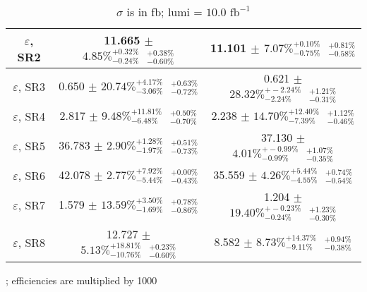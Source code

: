 \documentclass{article}
\begin{document}
\begin{table}
\begin{tabular}{|c|c|c|}
\hline
$\varepsilon$, SR2 & 11.665 $\pm$ $4.85\%^{+0.32\%}_{-0.24\%} \textrm{ }^{+0.38\%}_{-0.60\%}$ & 11.101 $\pm$ $7.07\%^{+0.10\%}_{-0.75\%} \textrm{ }^{+0.81\%}_{-0.58\%}$ \\ 
\hline
$\varepsilon$, SR3 & 0.650 $\pm$ $20.74\%^{+4.17\%}_{-3.06\%} \textrm{ }^{+0.63\%}_{-0.72\%}$ & 0.621 $\pm$ $28.32\%^{+-2.24\%}_{-2.24\%} \textrm{ }^{+1.21\%}_{-0.31\%}$ \\ 
\hline
$\varepsilon$, SR4 & 2.817 $\pm$ $9.48\%^{+11.81\%}_{-6.48\%} \textrm{ }^{+0.50\%}_{-0.70\%}$ & 2.238 $\pm$ $14.70\%^{+12.40\%}_{-7.39\%} \textrm{ }^{+1.12\%}_{-0.46\%}$ \\ 
\hline
$\varepsilon$, SR5 & 36.783 $\pm$ $2.90\%^{+1.28\%}_{-1.97\%} \textrm{ }^{+0.51\%}_{-0.73\%}$ & 37.130 $\pm$ $4.01\%^{+-0.99\%}_{-0.99\%} \textrm{ }^{+1.07\%}_{-0.35\%}$ \\ 
\hline
$\varepsilon$, SR6 & 42.078 $\pm$ $2.77\%^{+7.92\%}_{-5.44\%} \textrm{ }^{+0.00\%}_{-0.43\%}$ & 35.559 $\pm$ $4.26\%^{+5.44\%}_{-4.55\%} \textrm{ }^{+0.74\%}_{-0.54\%}$ \\ 
\hline
$\varepsilon$, SR7 & 1.579 $\pm$ $13.59\%^{+3.50\%}_{-1.69\%} \textrm{ }^{+0.78\%}_{-0.86\%}$ & 1.204 $\pm$ $19.40\%^{+-0.23\%}_{-0.24\%} \textrm{ }^{+1.23\%}_{-0.30\%}$ \\ 
\hline
$\varepsilon$, SR8 & 12.727 $\pm$ $5.13\%^{+18.81\%}_{-10.76\%} \textrm{ }^{+0.23\%}_{-0.60\%}$ & 8.582 $\pm$ $8.73\%^{+14.37\%}_{-9.11\%} \textrm{ }^{+0.94\%}_{-0.38\%}$ \\ 
\hline
\end{tabular}
\caption{$\sigma$ is in fb; lumi = $10.0\textrm{ fb}^{-1}$}; efficiencies are multiplied by 1000
\end{table}
\end{document}
